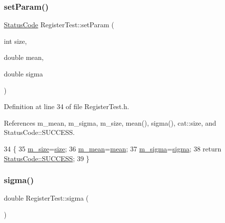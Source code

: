 \subsubsection{\texorpdfstring{set\+Param()}{setParam()}}
{\footnotesize\ttfamily \hyperlink{classStatusCode}{Status\+Code} Register\+Test\+::set\+Param (\begin{DoxyParamCaption}\item[{int}]{size,  }\item[{double}]{mean,  }\item[{double}]{sigma }\end{DoxyParamCaption})\hspace{0.3cm}{\ttfamily [inline]}}



Definition at line 34 of file Register\+Test.\+h.



References m\+\_\+mean, m\+\_\+sigma, m\+\_\+size, mean(), sigma(), cat\+::size, and Status\+Code\+::\+S\+U\+C\+C\+E\+SS.


\begin{DoxyCode}
34                                                             \{
35     \hyperlink{classRegisterTest_ab543b709d593b4ae36c628c60da76923}{m\_size}=\hyperlink{namespacecat_a3eae50bb86a614752045105e00365a46}{size};
36     \hyperlink{classRegisterTest_aba5ac8088017236617d2244fc0c261b9}{m\_mean}=\hyperlink{classRegisterTest_a5d3726a88a7fdcd90981bb5de8399df9}{mean};
37     \hyperlink{classRegisterTest_a17f1f3646bf00ae7ab6744afca9e6813}{m\_sigma}=\hyperlink{classRegisterTest_af2a1f9ac2798188e52198fc264ae55cc}{sigma};
38     \textcolor{keywordflow}{return} \hyperlink{classStatusCode_a6f565cbeadc76d14c72f047e5e85eb4badd0da38d3ba0d922efd1f4619bc37ad8}{StatusCode::SUCCESS};
39   \}
\end{DoxyCode}
\mbox{\label{classRegisterTest_af2a1f9ac2798188e52198fc264ae55cc}} 
\subsubsection{\texorpdfstring{sigma()}{sigma()}}
{\footnotesize\ttfamily double Register\+Test\+::sigma (\begin{DoxyParamCaption}{ }\end{DoxyParamCaption})\hspace{0.3cm}{\ttfamily [inline]}}



